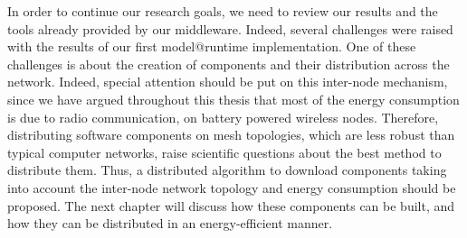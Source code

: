 In order to continue our research goals, we need to review our results and the tools already provided by our middleware.
Indeed, several challenges were raised with the results of our first model@runtime implementation.
One of these challenges is about the creation of components and their distribution across the network.
Indeed, special attention should be put on this inter-node mechanism, since we have argued throughout this thesis that most of the energy consumption is due to radio communication, on battery powered wireless nodes.
Therefore, distributing software components on mesh topologies, which are less robust than typical computer networks, raise scientific questions about the best method to distribute them.
Thus, a distributed algorithm to download components taking into account the inter-node network topology and energy consumption should be proposed.
The next chapter will discuss how these components can be built, and how they can be distributed in an energy-efficient manner.

